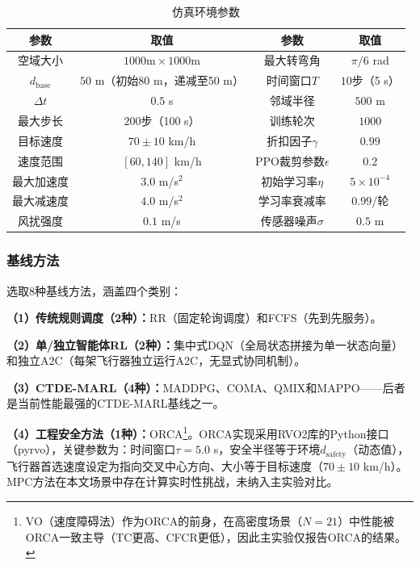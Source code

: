 \documentclass[12pt,a4paper,UTF8]{ctexart}
\begin{document}
\begin{table}[H]
    \centering\small
    \caption{仿真环境参数}
    \label{tab:env}
    \begin{tabular}{|c|c|c|c|}
        \hline
        \textbf{参数} & \textbf{取值} & \textbf{参数} & \textbf{取值} \\
        \hline
        空域大小 & $1000\text{m}\times1000\text{m}$ & 最大转弯角 & $\pi/6$ rad \\
        $d_{\text{base}}$ & $50$ m（初始80 m，递减至50 m） & 时间窗口$T$ & $10$步（5 s） \\
        $\Delta t$ & $0.5$ s & 邻域半径 & $500$ m \\
        最大步长 & $200$步（100 s） & 训练轮次 & $1000$ \\
        目标速度 & $70 \pm 10$ km/h & 折扣因子$\gamma$ & $0.99$ \\
        速度范围 & $[60, 140]$ km/h & PPO裁剪参数$\epsilon$ & $0.2$ \\
        最大加速度 & $3.0$ m/s$^2$ & 初始学习率$\eta$ & $5 \times 10^{-4}$ \\
        最大减速度 & $4.0$ m/s$^2$ & 学习率衰减率 & $0.99$/轮 \\
        风扰强度 & $0.1$ m/s & 传感器噪声$\sigma$ & $0.5$ m \\
        \hline
    \end{tabular}
\end{table}

\subsubsection{基线方法}

选取8种基线方法，涵盖四个类别：

\textbf{（1）传统规则调度（2种）：}RR（固定轮询调度）和FCFS（先到先服务）。

\textbf{（2）单/独立智能体RL（2种）：}集中式DQN（全局状态拼接为单一状态向量）和独立A2C（每架飞行器独立运行A2C，无显式协同机制）。

\textbf{（3）CTDE-MARL（4种）：}MADDPG、COMA、QMIX和MAPPO——后者是当前性能最强的CTDE-MARL基线之一。

\textbf{（4）工程安全方法（1种）：}ORCA\cite{ref4}\footnote{VO（速度障碍法）作为ORCA的前身，在高密度场景（$N=21$）中性能被ORCA一致主导（TC更高、CFCR更低），因此主实验仅报告ORCA的结果。}。ORCA实现采用RVO2库的Python接口（pyrvo），关键参数为：时间窗口$\tau=5.0$ s，安全半径等于环境$d_{\text{safety}}$（动态值），飞行器首选速度设定为指向交叉中心方向、大小等于目标速度（$70\pm10$ km/h）。MPC方法在本文场景中存在计算实时性挑战，未纳入主实验对比。
\end{document}
